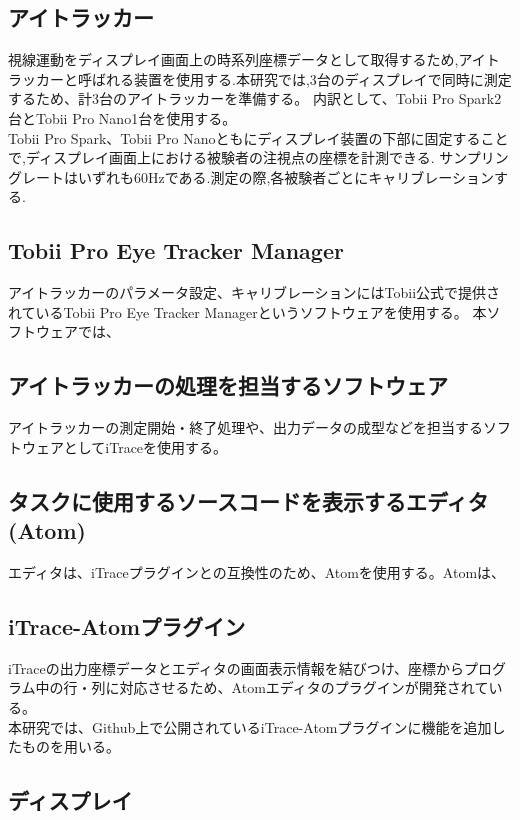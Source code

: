 \documentclass[paper=a4paper,fontsize=10pt]{jlreq}
\begin{document}
    \subsection{アイトラッカー}
      視線運動をディスプレイ画面上の時系列座標データとして取得するため,アイトラッカーと呼ばれる装置を使用する.本研究では,3台のディスプレイで同時に測定するため、計3台のアイトラッカーを準備する。
      内訳として、Tobii Pro Spark\cite{spark}2台とTobii Pro Nano\cite{nano}1台を使用する。
      \\
      Tobii Pro Spark、Tobii Pro Nanoともにディスプレイ装置の下部に固定することで,ディスプレイ画面上における被験者の注視点の座標を計測できる.
      サンプリングレートはいずれも60Hzである.測定の際,各被験者ごとにキャリブレーションする.

    \subsection{Tobii Pro Eye Tracker Manager}
      アイトラッカーのパラメータ設定、キャリブレーションにはTobii公式で提供されているTobii Pro Eye Tracker Managerというソフトウェアを使用する。
      本ソフトウェアでは、
    
    \subsection{アイトラッカーの処理を担当するソフトウェア}
      アイトラッカーの測定開始・終了処理や、出力データの成型などを担当するソフトウェアとしてiTrace\cite{itrace}を使用する。

    \subsection{タスクに使用するソースコードを表示するエディタ(Atom)}
      エディタは、iTraceプラグインとの互換性のため、Atom\cite{atom}を使用する。Atomは、

    \subsection{iTrace-Atomプラグイン}
      iTraceの出力座標データとエディタの画面表示情報を結びつけ、座標からプログラム中の行・列に対応させるため、Atomエディタのプラグインが開発されている。\\
      本研究では、Github上で公開されているiTrace-Atomプラグインに機能を追加したものを用いる。
    
      
    \subsection{ディスプレイ}
\end{document}
